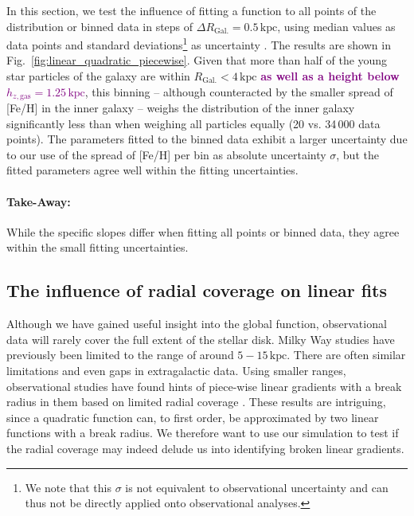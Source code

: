 \documentclass[twocolumn,apj,numberedappendix,appendixfloats,twocolappendix]{openjournal}
\newcommand{\adjusted}[1]{\textbf{\textcolor{purple}{#1}}}
\begin{document}
\begin{CJK*}{UTF8}{gbsn}
In this section, we test the influence of fitting a function to all points of the distribution or binned data in steps of $\Delta R_\mathrm{Gal.} = 0.5\,\mathrm{kpc}$, using median values as data points and standard deviations\footnote{We note that this $\sigma$ is not equivalent to observational uncertainty and can thus not be directly applied onto observational analyses.} as uncertainty \citep[see also][who fitted functions to radially binned IllustrisTNG data]{Hemler2021}. The results are shown in Fig.~\ref{fig:linear_quadratic_piecewise}. Given that more than half of the young star particles of the galaxy are within $R_\mathrm{Gal.} < 4\,\mathrm{kpc}$ \adjusted{as well as a height below $h_{z,\mathrm{gas}} = 1.25\,\mathrm{kpc}$}, this binning -- although counteracted by the smaller spread of [Fe/H] in the inner galaxy -- weighs the distribution of the inner galaxy significantly less than when weighing all particles equally (20 vs. 34\,000 data points). The parameters fitted to the binned data exhibit a larger uncertainty due to our use of the spread of [Fe/H] per bin as absolute uncertainty $\sigma$, but the fitted parameters agree well within the fitting uncertainties.

\paragraph*{Take-Away:} While the specific slopes differ when fitting all points or binned data, they agree within the small fitting uncertainties.

\subsection{The influence of radial coverage on linear fits}
\label{sec:radial_coverage}

Although we have gained useful insight into the global function, observational data will rarely cover the full extent of the stellar disk. Milky Way studies have previously been limited to the range of around $5-15\,\mathrm{kpc}$. There are often similar limitations and even gaps in extragalactic data. Using smaller ranges, observational studies have found hints of piece-wise linear gradients with a break radius in them based on limited radial coverage \citep[e.g.][]{Andrievsky2002, Yong2012, Boeche2013, Hayden2014, Anders2017, Donor2020, Chen2023}. These results are intriguing, since a quadratic function can, to first order, be approximated by two linear functions with a break radius. We therefore want to use our simulation to test if the radial coverage may indeed delude us into identifying broken linear gradients.


\end{CJK*}
\end{document}
